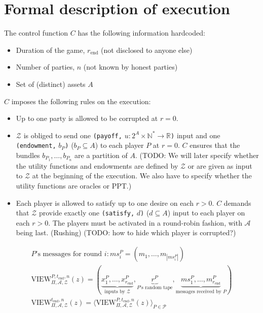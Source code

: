 \section{Formal description of execution}
  The control function $C$ has the following information hardcoded:
  \begin{itemize}
    \item Duration of the game, $r_{\mathrm{end}}$ (not disclosed to anyone else)
    \item Number of parties, $n$ (not known by honest parties)
    \item Set of (distinct) assets $A$
  \end{itemize}
  $C$ imposes the following rules on the execution:
  \begin{itemize}
    \item Up to one party is allowed to be corrupted at $r = 0$.
    \item $\mathcal{Z}$ is obliged to send one \texttt{(payoff,} $u : 2^A \times
    \mathbb{N}^* \rightarrow \mathbb{R}$\texttt{)} input and one \texttt{(endowment,}
    $b_P$\texttt{)} ($b_P \subseteq A$) to each player $P$ at $r = 0$. $C$ ensures that
    the bundles $b_{P_1}, \dots, b_{P_n}$ are a partition of $A$. (TODO: We will later
    specify whether the utility functions and endowments are defined by $\mathcal{Z}$ or
    are given as input to $\mathcal{Z}$ at the beginning of the execution. We also have to
    specify whether the utility functions are oracles or PPT.)
    \item Each player is allowed to satisfy up to one desire on each $r > 0$. $C$ demands
    that $\mathcal{Z}$ provide exactly one \texttt{(satisfy,} $d$\texttt{)} ($d \subseteq
    A$) input to each player on each $r > 0$. The players must be activated in a
    round-robin fashion, with $\mathcal{A}$ being last. (Rushing) (TODO: how to hide which
    player is corrupted?)
  \end{itemize}

  \begin{gather*}
    P\text{'s messages for round } i: ms^P_i = \left(m_1, \dots, m_{|ms^P_i|}\right) \\
    \mathrm{VIEW}^{P, t_{\mathrm{end}}, n}_{\Pi, \mathcal{A}, \mathcal{Z}}\left(z\right) =
    \left(\underbrace{x^P_1, \dots, x^P_{r_{\mathrm{end}}}}_{\text{inputs by }
    \mathcal{Z}}, \underbrace{r^P}_{P\text{'s random tape}}, \underbrace{ms^P_1, \dots,
    m^P_{r_{\mathrm{end}}}}_{\text{messages received by } P}\right) \\
    \mathrm{VIEW}^{t_{\mathrm{end}}, n}_{\Pi, \mathcal{A}, \mathcal{Z}}\left(z\right) =
    \langle\mathrm{VIEW}^{P, t_{\mathrm{end}}, n}_{\Pi, \mathcal{A},
    \mathcal{Z}}\left(z\right)\rangle_{P \in \mathcal{P}}
  \end{gather*}

